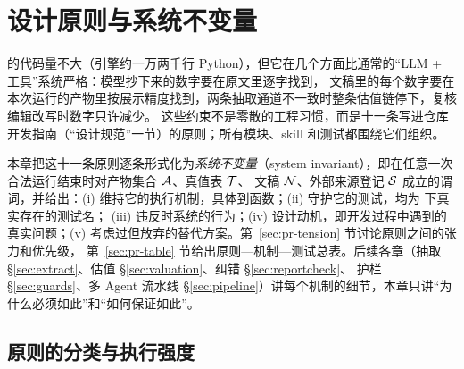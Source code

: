 \section{设计原则与系统不变量}
\label{sec:principles}

\newcommand{\prTok}{\operatorname{Tok}}        %
\newcommand{\prVal}{\mathsf{V}}                %
\newcommand{\prFound}{\operatorname{Found}}    %
\newcommand{\prIss}{\mathcal{I}}               %
\newcommand{\prRej}{\mathcal{R}}               %
\newcommand{\prBlock}{\operatorname{Block}}    %
\newcommand{\prWS}{\mathcal{W}}                %
\newcommand{\prRepo}{\mathcal{G}}              %
\newcommand{\prT}[1]{{\let\prUS\_\def\_{\prUS\allowbreak}\code{#1}}}  %
\sloppy  %

\sysname{} 的代码量不大（引擎约一万两千行 Python），但它在几个方面比通常的“LLM + 工具”系统严格：模型抄下来的数字要在原文里逐字找到，
文稿里的每个数字要在本次运行的产物里按展示精度找到，两条抽取通道不一致时整条估值链停下，复核编辑改写时数字只许减少。
这些约束不是零散的工程习惯，而是十一条写进仓库开发指南（“设计规范”一节）的原则；所有模块、skill 和测试都围绕它们组织。

本章把这十一条原则逐条形式化为\emph{系统不变量}（system invariant），即在任意一次合法运行结束时对产物集合 $\mathcal{A}$、真值表 $\mathcal{T}$、
文稿 $\mathcal{N}$、外部来源登记 $\mathcal{S}$ 成立的谓词，并给出：(i) 维持它的执行机制，具体到函数；(ii) 守护它的测试，均为  下真实存在的测试名；
(iii) 违反时系统的行为；(iv) 设计动机，即开发过程中遇到的真实问题；(v) 考虑过但放弃的替代方案。第~\ref{sec:pr-tension} 节讨论原则之间的张力和优先级，
第~\ref{sec:pr-table} 节给出原则—机制—测试总表。后续各章（抽取 \S\ref{sec:extract}、估值 \S\ref{sec:valuation}、纠错 \S\ref{sec:reportcheck}、
护栏 \S\ref{sec:guards}、多 Agent 流水线 \S\ref{sec:pipeline}）讲每个机制的细节，本章只讲“为什么必须如此”和“如何保证如此”。

\subsection{原则的分类与执行强度}
\label{sec:pr-taxonomy}

